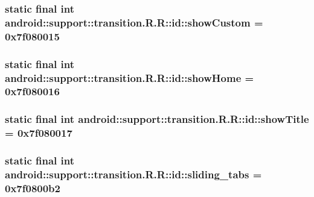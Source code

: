 \hypertarget{classandroid_1_1support_1_1transition_1_1_r_1_1id_ce880811cdd6dede0fdd38adbd644715}{
\subsubsection[{showCustom}]{\setlength{\rightskip}{0pt plus 5cm}static final int android::support::transition.R.R::id::showCustom = 0x7f080015}}
\label{classandroid_1_1support_1_1transition_1_1_r_1_1id_ce880811cdd6dede0fdd38adbd644715}


\hypertarget{classandroid_1_1support_1_1transition_1_1_r_1_1id_c00b60f21b6b5d9c198e6592a1f799d6}{
\subsubsection[{showHome}]{\setlength{\rightskip}{0pt plus 5cm}static final int android::support::transition.R.R::id::showHome = 0x7f080016}}
\label{classandroid_1_1support_1_1transition_1_1_r_1_1id_c00b60f21b6b5d9c198e6592a1f799d6}


\hypertarget{classandroid_1_1support_1_1transition_1_1_r_1_1id_3796b646cd311c20e41d3346c6e449e5}{
\subsubsection[{showTitle}]{\setlength{\rightskip}{0pt plus 5cm}static final int android::support::transition.R.R::id::showTitle = 0x7f080017}}
\label{classandroid_1_1support_1_1transition_1_1_r_1_1id_3796b646cd311c20e41d3346c6e449e5}


\hypertarget{classandroid_1_1support_1_1transition_1_1_r_1_1id_5b8d4eda0b9d8f8a6752462f43d88103}{
\subsubsection[{sliding\_\-tabs}]{\setlength{\rightskip}{0pt plus 5cm}static final int android::support::transition.R.R::id::sliding\_\-tabs = 0x7f0800b2}}
\label{classandroid_1_1support_1_1transition_1_1_r_1_1id_5b8d4eda0b9d8f8a6752462f43d88103}


